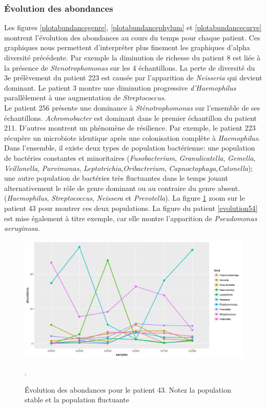 \documentclass[12pt,a4paper]{article}
\begin{document}
\subsubsection{Évolution des abondances}
Les figures \ref{plotabundancegenre}, \ref{plotabundancephylum} et \ref{plotabundancecurve} montrent l’évolution des abondances au cours du temps pour chaque patient. Ces graphiques nous permettent d’interpréter plus finement les graphiques d’alpha diversité précédente.
Par exemple la diminution de richesse du patient 8 est liée à la présence de \textit{Stenotrophomonas} sur les 4 échantillons.
La perte de diversité du 3e prélèvement du patient 223 est causée par l'apparition de \textit{Neisseria} qui devient dominant.
Le patient 3 montre une diminution progressive \textit{d’Haemophilus} parallèlement à une augmentation de \textit{Streptococcus}. \\
Le patient 256 présente une dominance à \textit{Sténotrophomonas} sur l'ensemble de ses échantillons. \textit{Achromobacter} est dominant dans le premier échantillon du patient 211.
D’autres montrent un phénomène de résilience. Par exemple, le patient 223 récupère un microbiote identique après une colonisation complète à \textit{Haemophilus}. \\
Dans l’ensemble, il existe deux types de population bactérienne: une population de bactéries constantes et minoritaires (\textit{Fusobacterium}, \textit{Granulicatella}, \textit{Gemella}, \textit{Veillonella}, \textit{Parvimonas}, \textit{Leptotrichia},\textit{Oribacterium}, \textit{Capnoctophaga},\textit{Catonella}); une autre population de bactéries très fluctuantes dans le temps jouant alternativement le rôle de genre dominant ou au contraire du genre absent. (\textit{Haemophilus}, \textit{Streptococcus}, \textit{Neissera} et \textit{Prevotella}).
La figure \ref{evolution43} zoom sur le patient 43 pour montrer ces deux populations. La figure du patient \ref{evolution54} est mise également à titre exemple, car elle montre l’apparition de \textit{Pseudomonas aeruginosa}. \\

\begin{figure}
\begin{center}
\includegraphics[scale=0.60]{img/curve_043.png}\hfill
\end{center}
\caption{Évolution des abondances pour le patient 43. Notez la population stable et la population fluctuante}.
\label{evolution43}
\end{figure}
\end{document}
